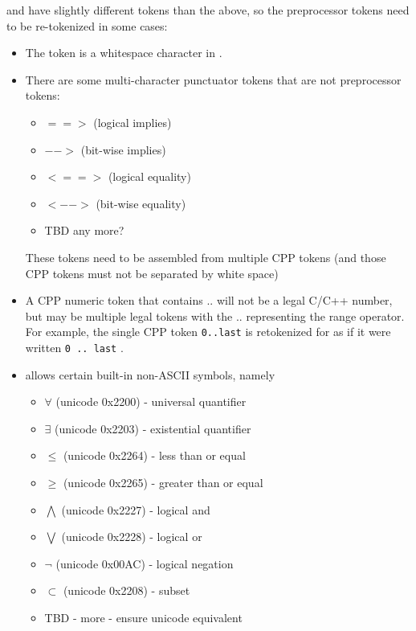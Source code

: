 \acsl and \NAME{} have slightly different tokens than the above, so the preprocessor tokens need to be re-tokenized in some cases:
\begin{itemize}
	\item The \@ token is a whitespace character in \acslb.
	\item There are some \acslb multi-character punctuator tokens that are not
	preprocessor tokens:
	\begin{itemize}
		\item[] $==>$ (logical implies)
		\item[] $-->$ (bit-wise implies)
		\item[] $<==>$ (logical equality)
		\item[] $<-->$ (bit-wise equality)
		\item[] TBD any more?
	\end{itemize}
	These \acslb tokens need to be assembled from multiple CPP tokens (and those CPP tokens must not be separated by white space)
	\item A CPP numeric token that contains .. will not be a legal C/C++ number, but may be multiple legal \acslb tokens with the .. representing the range operator.  For example, the single CPP token \texttt{0..last} is retokenized for \acslb as if it were written \texttt{0 .. last} .
	\item \acslb allows certain built-in non-ASCII symbols, namely
	\begin{itemize}
		\item[] $\forall$ (unicode 0x2200) - universal quantifier
		\item[] $\exists$ (unicode 0x2203) - existential quantifier
		\item[] $\leq$ (unicode 0x2264) - less than or equal
		\item[] $\geq$ (unicode 0x2265) - greater than or equal
		\item[] $\bigwedge$ (unicode 0x2227) - logical and
		\item[] $\bigvee$ (unicode 0x2228) - logical or
		\item[] $\neg$ (unicode 0x00AC) - logical negation
		\item[] $\subset$ (unicode 0x2208) - subset
		\item TBD - more - ensure unicode equivalent
	\end{itemize}
\end{itemize}

